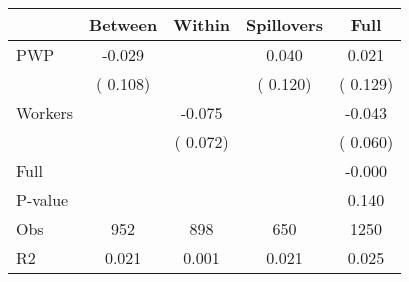 
\begin{tabular}{l*{4}{c}}\hline&\multicolumn{1}{c}{Between}&\multicolumn{1}{c}{Within}&\multicolumn{1}{c}{Spillovers}&\multicolumn{1}{c}{Full}\\ \hline
 PWP           &             -0.029      &                                               &        0.040 &         0.021                            \\ 
                               &        (       0.108)           &                                       &       (       0.120)     &      (       0.129)                                           \\ 
 Workers       &                                               &       -0.075    &                                &            -0.043                            \\ 
                               &                                               & (       0.072)                  &                                        &      (       0.060)                                           \\ 
\hline                                                                                                                                                                                                                                            
 Full                  &                                               &                                               &                                        &            -0.000                                     \\ 
 P-value               &                                               &                                               &                                        &             0.140                                           \\ 
 Obs                   &               952               &       898                       &       650                &              1250                                               \\ 
 R2                    &                      0.021              &              0.001                      &              0.021               &                     0.025                                              \\ 
\hline \end{tabular}                                                                                                                                                                                                              